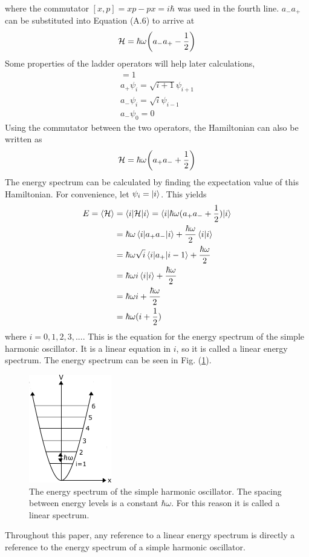 where the commutator $[x,p]=xp-px=i\hbar$ was used in the fourth line. $a_-a_+$ can be substituted into Equation (A.6) to arrive at 
\begin{equation}
    \mathcal{H}=\hbar\omega\qty(a_-a_+-\frac{1}{2})
\end{equation}
Some properties of the ladder operators will help later calculations,
\begin{gather}
    [a_-,a_+]=1\\
    a_+\psi_i=\sqrt{i+1} \psi_{i+1}\\
    a_-\psi_i=\sqrt{i}\psi_{i-1}\\
    a_-\psi_0=0
\end{gather}
Using the commutator between the two operators, the Hamiltonian can also be written as 
\begin{equation}
    \mathcal{H}=\hbar\omega\qty(a_+a_-+\frac{1}{2})
\end{equation}
The energy spectrum can be calculated by finding the expectation value of this Hamiltonian. For convenience, let $\psi_i=\ket{i}$. This yields 
\begin{align}
    E=\left<{\mathcal{H}}\right>&=\braket{i|\mathcal{H}|i}=\braket{i|\hbar\omega (a_+a_-+\frac{1}{2})|i}\nonumber\\
    &=\hbar\omega \braket{i|a_+a_-|i}+\frac{\hbar\omega}{2}\braket{i|i}\nonumber\\
    &=\hbar\omega \sqrt{i}\braket{i|a_+|i-1}+\frac{\hbar\omega}{2}\nonumber\\
    &=\hbar\omega i \braket{i|i}+\frac{\hbar\omega}{2}\nonumber\\
    &=\hbar\omega i +\frac{\hbar\omega}{2}\nonumber\\
    &=\hbar\omega(i+\frac{1}{2})
\end{align}
where $i=0,1,2,3,...$. This is the equation for the energy spectrum of the simple harmonic oscillator. It is a linear equation in $i$, so it is called a linear energy spectrum. The energy spectrum can be seen in Fig. (\ref{fig:Simple Harmonic Oscillator Spectrum}).
\begin{figure}[H]
    \centering
    \includegraphics[scale=1.0]{figures/pdf/SHOspectrum.png}
    \caption{The energy spectrum of the simple harmonic oscillator. The spacing between energy levels is a constant $\hbar\omega$. For this reason it is called a linear spectrum.}
    \label{fig:Simple Harmonic Oscillator Spectrum}
\end{figure}Throughout this paper, any reference to a linear energy spectrum is directly a reference to the energy spectrum of a simple harmonic oscillator.

